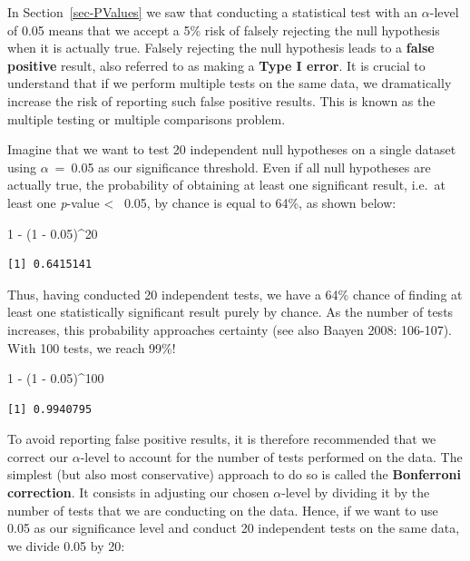 \documentclass[
  letterpaper,
  DIV=11,
  numbers=noendperiod]{scrreprt}
\newenvironment{Shaded}{\begin{snugshade}}{\end{snugshade}}
\newcommand{\DecValTok}[1]{\textcolor[rgb]{0.68,0.00,0.00}{#1}}
\newcommand{\FloatTok}[1]{\textcolor[rgb]{0.68,0.00,0.00}{#1}}
\newcommand{\NormalTok}[1]{\textcolor[rgb]{0.00,0.23,0.31}{#1}}
\newcommand{\SpecialCharTok}[1]{\textcolor[rgb]{0.37,0.37,0.37}{#1}}
\begin{document}
In Section~\ref{sec-PValues} we saw that conducting a statistical test
with an \(\alpha\)-level of 0.05 means that we accept a 5\% risk of
falsely rejecting the null hypothesis when it is actually true. Falsely
rejecting the null hypothesis leads to a \textbf{false positive} result,
also referred to as making a \textbf{Type I error}. It is crucial to
understand that if we perform multiple tests on the same data, we
dramatically increase the risk of reporting such false positive results.
This is known as the multiple testing or multiple comparisons problem.

Imagine that we want to test 20 independent null hypotheses on a single
dataset using \(\alpha\)~=~0.05 as our significance threshold. Even if
all null hypotheses are actually true, the probability of obtaining at
least one significant result, i.e.~at least one \emph{p}-value
\textless~ 0.05, by chance is equal to 64\%, as shown below:

\begin{Shaded}
\begin{Highlighting}[]
\DecValTok{1} \SpecialCharTok{{-}}\NormalTok{ (}\DecValTok{1} \SpecialCharTok{{-}} \FloatTok{0.05}\NormalTok{)}\SpecialCharTok{\^{}}\DecValTok{20}
\end{Highlighting}
\end{Shaded}

\begin{verbatim}
[1] 0.6415141
\end{verbatim}

Thus, having conducted 20 independent tests, we have a 64\% chance of
finding at least one statistically significant result purely by chance.
As the number of tests increases, this probability approaches certainty
(see also Baayen 2008: 106-107). With 100 tests, we reach 99\%!

\begin{Shaded}
\begin{Highlighting}[]
\DecValTok{1} \SpecialCharTok{{-}}\NormalTok{ (}\DecValTok{1} \SpecialCharTok{{-}} \FloatTok{0.05}\NormalTok{)}\SpecialCharTok{\^{}}\DecValTok{100}
\end{Highlighting}
\end{Shaded}

\begin{verbatim}
[1] 0.9940795
\end{verbatim}

To avoid reporting false positive results, it is therefore recommended
that we correct our \(\alpha\)-level to account for the number of tests
performed on the data. The simplest (but also most conservative)
approach to do so is called the \textbf{Bonferroni correction}. It
consists in adjusting our chosen \(\alpha\)-level by dividing it by the
number of tests that we are conducting on the data. Hence, if we want to
use 0.05 as our significance level and conduct 20 independent tests on
the same data, we divide 0.05 by 20:
\end{document}
